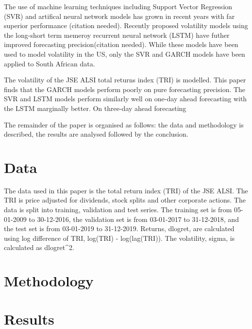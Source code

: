 \documentclass[11pt,preprint, authoryear]{elsarticle}
\numberwithin{equation}{section}
\numberwithin{figure}{section}
\numberwithin{table}{section}
\begin{document}
\par

The use of machine learning techniques including Support Vector
Regression (SVR) and artifical neural network models has grown in recent
years with far superior performance (citation needed). Recently proposed
volatility models using the long-short term memeroy recurrent neural
network (LSTM) have futher improved forecasting precision(citation
needed). While these models have been used to model volatility in the
US, only the SVR and GARCH models have been applied to South African
data.

\par

The volatility of the JSE ALSI total returns index (TRI) is modelled.
This paper finds that the GARCH models perform poorly on pure
forecasting precision. The SVR and LSTM models perform similarly well on
one-day ahead forecasting with the LSTM marginally better. On three-day
ahead forecasting

The remainder of the paper is organised as follows: the data and
methodology is described, the results are analysed followed by the
conclusion.

\hypertarget{data}{%
\section*{Data}\label{data}}

The data used in this paper is the total return index (TRI) of the JSE
ALSI. The TRI is price adjusted for dividends, stock splits and other
corporate actions. The data is split into training, validation and test
series. The training set is from 05-01-2009 to 30-12-2016, the
validation set is from 03-01-2017 to 31-12-2018, and the test set is
from 03-01-2019 to 31-12-2019. Returns, dlogret, are calculated using
log difference of TRI, log(TRI) - log(lag(TRI)). The volatility, sigma,
is calculated as dlogret\^{}2.

\hypertarget{methodology}{%
\section{\texorpdfstring{Methodology
\label{Meth}}{Methodology }}\label{methodology}}

\hypertarget{results}{%
\section{Results}\label{results}}
\end{document}
